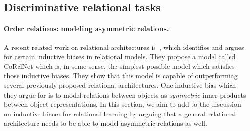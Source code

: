 \subsection{Discriminative relational tasks}\label{ssec:experiments_discriminative}

\paragraph{Order relations: modeling asymmetric relations.}
A recent related work on relational architectures is~\citep{kerg2022neural}, which identifies and argues for certain inductive biases in relational models. They propose a model called CoRelNet which is, in some sense, the simplest possible model which satisfies those inductive biases. They show that this model is capable of outperforming several previously proposed relational architectures. One inductive bias which they argue for is to model relations between objects as \textit{symmetric} inner products between object representations. In this section, we aim to add to the discussion on inductive biases for relational learning by arguing that a general relational architecture needs to be able to model asymmetric relations as well.



